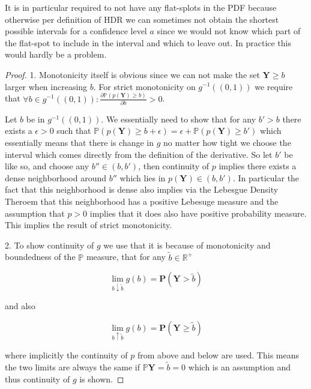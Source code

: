 It is in particular required to not have any flat-splots in the PDF because otherwise per definition of HDR we can sometimes not obtain the shortest possible intervals for a confidence level $a$ since we would not know which part of the flat-spot to include in the interval and which to leave out. In practice this would hardly be a problem.

\begin{proof}
    1. Monotonicity itself is obvious since we can not make the set $\mathbf{Y} \geq b$ larger when increasing $b$. For strict monotonicity on $g^{-1}((0,1))$ we require that $\forall b \in g^{-1}((0,1)): \frac{\partial \mathbb{P}(p(\mathbf{Y}) \geq b)}{\partial b} > 0$.
    
    Let $b$ be in $g^{-1}((0,1))$. We essentially need to show that for any $b' > b$ there exists a $\epsilon > 0$ such that $\mathbb{P}(p(\mathbf{Y}) \geq b + \epsilon) = \epsilon + \mathbb{P}(p(\mathbf{Y}) \geq b')$ which essentially means that there is change in $g$ no matter how tight we choose the interval which comes directly from the definition of the derivative. So let $b'$ be like so, and choose any $b'' \in (b, b')$, then continuity of $p$ implies there exists a dense neighborhood around $b''$ which lies in $p(\mathbf{Y}) \in (b, b')$. In particular the fact that this neighborhood is dense also implies via the Lebesgue Density Theroem that this neighborhood has a positive Lebesuge measure and the assumption that $p > 0$ implies that it does also have positive probability measure. This implies the result of strict monotonicity.

    2. To show continuity of $g$ we use that it is because of monotonicity and boundedness of the $\mathbb{P}$ measure, that for any $\tilde{b}\in\mathbb{R}^+$

    \begin{equation}
        \lim_{b \downarrow \tilde{b}} g(b) = \mathbf{P}(\mathbf{Y} > \tilde{b})
    \end{equation}
        
    and also

    \begin{equation}
        \lim_{b \uparrow \tilde{b}} g(b) = \mathbf{P}(\mathbf{Y} \geq \tilde{b})
    \end{equation}

    where implicitly the continuity of $p$ from above and below are used. This means the two limits are always the same if $\mathbb{P}{\mathbf{Y} = \tilde{b}} = 0$ which is an assumption and thus continuity of $g$ is shown.


\end{proof}
